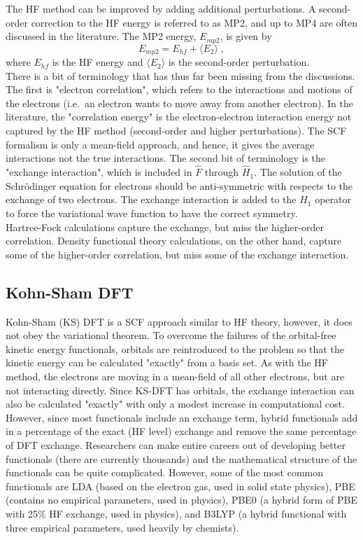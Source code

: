 \documentclass[12pt]{report}
\begin{document}
The HF method can be improved by adding additional perturbations.
A second-order correction to the HF energy is referred to as MP2, and up to
MP4 are often discussed in the literature.
The MP2 energy, $E_{mp2}$, is given by
\begin{equation}
 E_{mp2} = E_{hf} + \langle E_{2} \rangle \; ,
\end{equation}
where $E_{hf}$ is the HF energy and $\langle E_2 \rangle$ is the second-order
perturbation. \\

There is a bit of terminology that has thus far been missing from the
discussions.
The first is "electron correlation", which refers to the interactions and
motions of the electrons (i.e.\ an electron wants to move away from another
electron).
In the literature, the "correlation energy" is the electron-electron
interaction energy not captured by the HF method (second-order and higher
perturbations).
The SCF formalism is only a mean-field approach, and hence, it gives the
average interactions not the true interactions.
The second bit of terminology is the "exchange interaction", which is included
in $\hat F$ through $\hat H_1$.
The solution of the Schr\"{o}dinger equation for electrons should be
anti-symmetric with respects to the exchange of two electrons.
The exchange interaction is added to the $\hat H_1$ operator to force the
variational wave function to have the correct symmetry. \\

Hartree-Fock calculations capture the exchange, but miss the higher-order
correlation.
Density functional theory calculations, on the other hand, capture some of the
higher-order correlation, but miss some of the exchange interaction.

\subsection{Kohn-Sham DFT}

Kohn-Sham (KS) DFT is a SCF approach similar to HF theory, however, it does
not obey the variational theorem.
To overcome the failures of the orbital-free kinetic energy functionals,
orbitals are reintroduced to the problem so that the kinetic energy can be
calculated "exactly" from a basis set.
As with the HF method, the electrons are moving in a mean-field of all other
electrons, but are not interacting directly.
Since KS-DFT has orbitals, the exchange interaction can also be calculated
"exactly" with only a modest increase in computational cost.
However, since most functionals include an exchange term, hybrid functionals
add in a percentage of the exact (HF level) exchange and remove the same
percentage of DFT exchange.
Researchers can make entire careers out of developing better functionals
(there are currently thousands) and the mathematical structure of the
functionals can be quite complicated.
However, some of the most common functionals are LDA (based on the electron
gas, used in solid state physics), PBE (contains no empirical parameters, used
in physics), PBE0 (a hybrid form of PBE with 25\% HF exchange, used in
physics), and B3LYP (a hybrid functional with three empirical parameters, used
heavily by chemists).
\end{document}
